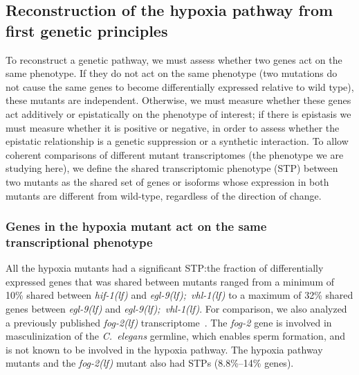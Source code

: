 \documentclass[9pt,twocolumn,twoside]{pnas-new}
\newcommand{\cel}{\emph{C.~elegans}}
\newcommand{\gene}[1]{\mbox{\emph{#1}}}
\newcommand{\fog}{\gene{fog-2(lf)}}
\newcommand{\egl}{\gene{egl-9(lf)}}
\newcommand{\eglvhl}{\gene{egl-9(lf); vhl-1(lf)}}
\newcommand{\hif}{\gene{hif-1(lf)}}
\begin{document}
\subsection*{Reconstruction of the hypoxia pathway from first genetic principles}
\label{sec:reconstruct}
To reconstruct a genetic pathway, we must assess whether two genes act on
the same phenotype. If they do not act on the same phenotype (two mutations do
not cause the same genes to become differentially expressed relative to
wild type), these mutants are independent. Otherwise, we must measure whether
these genes act additively or epistatically on the phenotype of interest; if
there is epistasis we must measure whether it is positive or negative, in order
to assess whether the epistatic relationship is a genetic suppression or a
synthetic interaction. To allow coherent comparisons of different mutant
transcriptomes (the phenotype we are studying here), we define the shared
transcriptomic phenotype (STP) between two mutants as the shared set of genes or
isoforms whose expression in both mutants are different from wild-type,
regardless of the direction of change.

\subsubsection*{Genes in the hypoxia mutant act on the same transcriptional
                phenotype}
\label{sec:phenotypes}
All the hypoxia mutants had a significant STP:\@ the fraction of differentially
expressed genes that was shared between mutants ranged from a minimum of 10\%
shared between \hif{} and \eglvhl{} to a maximum of 32\% shared genes between
\egl{} and \eglvhl{}. For comparison, we also analyzed a previously published
\fog{} transcriptome~\cite{Angeles-Albores2017a}. The \gene{fog-2} gene is
involved in masculinization of the \cel{} germline, which enables sperm
formation, and is not known to be involved in the hypoxia pathway. The hypoxia
pathway mutants and the \fog{} mutant also had STPs (8.8\%--14\% genes).
\end{document}
